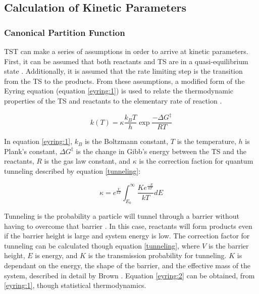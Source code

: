 \documentclass[preprint, 11pt]{elsarticle} %
\begin{document}
\subsection{Calculation of Kinetic Parameters}

\subsubsection{Canonical Partition Function}

TST can make a series of assumptions in order to arrive at kinetic parameters. 
First, it can be assumed that both reactants and TS are in a quasi-equilibrium state \cite{QSS:2017}.
Additionally, it is assumed that the rate limiting step is the transition from the TS to the products. 
From these assumptions, a modified form of the Eyring equation (equation \ref{eyring:1}) is used to relate the thermodynamic properties of the TS and reactants to the elementary rate of reaction \cite{eyring:1935}.

\begin{equation}
    k(T) = \kappa \frac{k_B T}{h} \exp{\frac{-\Delta G^\ddagger}{RT}}
    \label{eyring:1}
\end{equation}

In equation \ref{eyring:1}, $k_B$ is the Boltzmann constant, $T$ is the temperature, $h$ is Plank's constant, $\Delta G^\ddagger$ is the change in Gibb's energy between the TS and the reactants,  $R$ is the gas law constant, and $\kappa$ is the correction faction for quantum tunneling described by equation \ref{tunneling}:

\begin{equation}
    \kappa = e^{\frac{V}{kT}} \int^{\infty}_{E_0} \frac{K e^{\frac{-E}{kT}}}{kT} dE
    \label{tunneling}
\end{equation}

Tunneling is the probability a particle will tunnel through a barrier without having to overcome that barrier \cite{RUBAKOV:1984}.
In this case, reactants will form products even if the barrier height is large and system energy is low. 
The correction factor for tunneling can be calculated though equation \ref{tunneling}, where $V$ is the barrier height, $E$ is energy, and $K$ is the transmission probability for tunneling.
$K$ is dependant on the energy, the shape of the barrier, and the effective mass of the system, described in detail by Brown \cite{Brown:1981}.
Equation \ref{eyring:2} can be obtained, from \ref{eyring:1}, though statistical thermodynamics.
\end{document}
